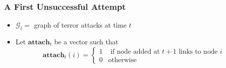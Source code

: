 \begin{frame}
\frametitle{A First Unsuccessful Attempt}

\begin{itemize}
\item $\mathcal{G}_t = $ graph of terror attacks at time $t$
\item Let $\textbf{attach}_t$ be a vector such that
\begin{equation}
\textbf{attach}_t(i)= \begin{cases}
1 		& \text{ if node added at } t+1 \text{ links to node }i \\
0		& \text{otherwise}
\end{cases}
\end{equation}
\end{itemize}
\end{frame}